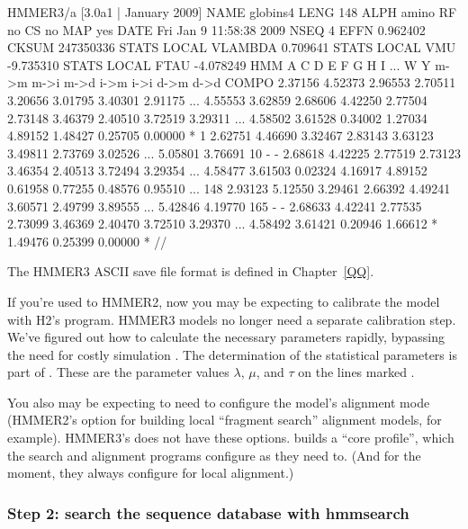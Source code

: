 \begin{sreoutput}
HMMER3/a [3.0a1 | January 2009]
NAME  globins4
LENG  148
ALPH  amino
RF    no
CS    no
MAP   yes
DATE  Fri Jan  9 11:58:38 2009
NSEQ  4
EFFN  0.962402
CKSUM 247350336
STATS LOCAL     VLAMBDA 0.709641
STATS LOCAL         VMU -9.735310
STATS LOCAL        FTAU -4.078249
HMM          A        C        D        E        F        G        H        I    ...   W        Y
            m->m     m->i     m->d     i->m     i->i     d->m     d->d
  COMPO   2.37156  4.52373  2.96553  2.70511  3.20656  3.01795  3.40301  2.91175 ... 4.55553  3.62859
          2.68606  4.42250  2.77504  2.73148  3.46379  2.40510  3.72519  3.29311 ... 4.58502  3.61528
          0.34002  1.27034  4.89152  1.48427  0.25705  0.00000        *
      1   2.62751  4.46690  3.32467  2.83143  3.63123  3.49811  2.73769  3.02526 ... 5.05801  3.76691     10 - -
          2.68618  4.42225  2.77519  2.73123  3.46354  2.40513  3.72494  3.29354 ... 4.58477  3.61503
          0.02324  4.16917  4.89152  0.61958  0.77255  0.48576  0.95510
...
    148   2.93123  5.12550  3.29461  2.66392  4.49241  3.60571  2.49799  3.89555 ... 5.42846  4.19770    165 - -
          2.68633  4.42241  2.77535  2.73099  3.46369  2.40470  3.72510  3.29370 ... 4.58492  3.61421
          0.20946  1.66612        *  1.49476  0.25399  0.00000        *
//
\end{sreoutput}

The HMMER3 ASCII save file format is defined in Chapter~\ref{QQ}.

If you're used to HMMER2, now you may be expecting to calibrate the
model with H2's  program. HMMER3 models no longer
need a separate calibration step. We've figured out how to calculate
the necessary parameters rapidly, bypassing the need for costly
simulation \citep{Eddy08}. The determination of the statistical
parameters is part of . These are the parameter values
$\lambda$, $\mu$, and $\tau$ on the lines marked .

You also may be expecting to need to configure the model's alignment
mode (HMMER2's  option for building local ``fragment
search'' alignment models, for example). HMMER3's  does
not have these options.  builds a ``core profile'',
which the search and alignment programs configure as they need
to. (And for the moment, they always configure for local alignment.)


\subsubsection{Step 2: search the sequence database with hmmsearch}


